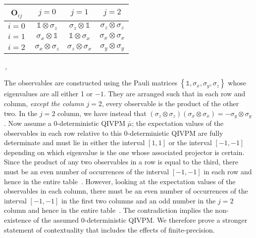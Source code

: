 \documentclass[english,reprint, aps, prl,superscriptaddress, showpacs,
showkeys, longbibliography, amsmath, amssymb, floatfix]{revtex4-1}
\theoremstyle{plain}
\theoremstyle{definition}
\begin{document}
{\renewcommand{\arraystretch}{2}%
\begin{center}
\begin{tabular}{r|@{\quad}c@{\quad}|@{\quad}c@{\quad}|@{\quad}c@{\quad}|}
$\mathbf{O}_{ij}$~ & $j=0$ & $j=1$ & $j=2$ \\
\hline 
$i=0~$ & $\mathbb{1}\otimes\sigma_{z}$  & $\sigma_{z}\otimes\mathbb{1}$  & $\sigma_{z}\otimes\sigma_{z}$ \tabularnewline
\hline 
$i=1~$ & $\sigma_{x}\otimes\mathbb{1}$  & $\mathbb{1}\otimes\sigma_{x}$  & $\sigma_{x}\otimes\sigma_{x}$ \tabularnewline
\hline 
$i=2~$ & $\sigma_{x}\otimes\sigma_{z}$  & $\sigma_{z}\otimes\sigma_{x}$  & $\sigma_{y}\otimes\sigma_{y}$ \tabularnewline
\hline 
\end{tabular}\,,
\par\end{center}
} 

\noindent The observables are constructed using the Pauli matrices
$\left\{ \mathbb{1},\sigma_{x},\sigma_{y},\sigma_{z}\right\}$ whose
eigenvalues are all either 1 or $-1$. They are arranged such that in
each row and column, \emph{except the column $j=2$}, every observable
is the product of the other two. In the $j=2$ column, we have instead
that
$\left(\sigma_{z}\otimes\sigma_{z}\right)\left(\sigma_{x}\otimes\sigma_{x}\right)=-\sigma_{y}\otimes\sigma_{y}$. Now
assume a 0-deterministic QIVPM ${\bar{\mu}}$; the expectation values
of the observables in each row relative to this 0-deterministic QIVPM
are fully determinate and must lie in either the interval $[1,1]$ or
the interval $[-1,-1]$ depending on which eigenvalue is the one whose
associated projector is certain. Since the product of any two
observables in a row is equal to the third, there must be an even
number of occurrences of the interval $[-1,-1]$ in each row and hence
in the entire table~\citep{HOSTunpublished}. However, looking at the expectation values of the
observables in each column, there must be an even number of
occurrences of the interval $[-1,-1]$ in the first two columns and an
odd number in the $j=2$ column and hence in the entire table~\citep{HOSTunpublished}. The
contradiction implies the non-existence of the assumed 0-deterministic
QIVPM. We therefore prove a stronger statement of contextuality that
includes the effects of finite-precision.
\end{document}
